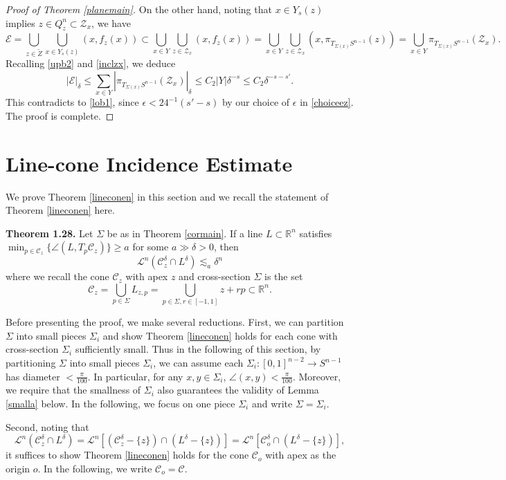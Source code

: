 \documentclass[11pt,a4paper,reqno]{amsart}
\newcommand{\R}{\mathbb{R}}
\newcommand{\calL}{\mathcal{L}}
\newcommand{\calC}{\mathcal{C}}
\newcommand{\calZ}{\mathcal{Z}}
\newcommand{\1}{\mathbf{1}}
\numberwithin{equation}{section}
\theoremstyle{plain}
\theoremstyle{definition}
\theoremstyle{remark}
\begin{document}
\begin{proof}[Proof of Theorem \ref{planemain}]
On the other hand,
noting that $x\in Y_s(z)$ implies $z\in Q_z^n \subset \calZ_x$, we have
$$ \mathcal{E} = \bigcup_{z \in \widetilde{Z}} \bigcup_{x \in Y_s(z)}(x,f_{z}(x)) \subset \bigcup_{x \in Y} \bigcup_{z \in \calZ_x} (x,f_{z}(x)) = \bigcup_{x \in Y} \bigcup_{z \in \calZ_x} (x,\pi_{T_{\Sigma(x)}S^{n-1}}(z)) = \bigcup_{x \in Y}\pi_{T_{\Sigma(x)}S^{n-1}}(\calZ_x).$$
Recalling \eqref{upb2} and \eqref{inclzx},
we deduce
\begin{equation}\label{lob2}
  |\mathcal{E}|_\delta \le \sum_{x \in Y} |\pi_{T_{\Sigma(x)}S^{n-1}}(\calZ_x)|_\delta \le C_2|Y|\delta^{-s}\le C_2\delta^{-s-s'} .
\end{equation}
This contradicts to \eqref{lob1}, since $\epsilon < 24^{-1}(s'-s)$ by our choice of $\epsilon$ in \eqref{choiceez}. The proof is complete.
\end{proof}




\section{Line-cone Incidence Estimate}\label{s4}

We prove Theorem \ref{lineconen} in this section and we recall the statement of Theorem \ref{lineconen} here.

\medskip
\noindent
{\bf Theorem 1.28.}
Let $\Sigma$ be as in Theorem \ref{cormain}.
If a line $L \subset \R^n$ satisfies $\min_{p \in \calC_z}\{\angle(L,T_p\calC_z)\}  \ge a$ for some $a \gg \delta >0$, then
  $$\calL^{n}(\calC_z^\delta \cap L^\delta) \lesssim_a \delta^n $$
  where we recall the cone $\calC_z$ with apex $z$ and cross-section $\Sigma$ is the set
$$\calC_z = \bigcup_{p \in \Sigma} L_{z,p} = \bigcup_{p \in \Sigma, r \in [-1,1]} z + rp \subset \R^n.$$


Before presenting the proof, we make several reductions. First, we can partition $\Sigma$ into small pieces $\Sigma_i$ and show Theorem \ref{lineconen} holds for each cone with cross-section $\Sigma_i$ sufficiently small. Thus in the following of this section,
by partitioning $\Sigma$ into small pieces $\Sigma_i$, we can assume each $\Sigma_i: [0,1]^{n-2} \to S^{n-1}$ has diameter $<\frac{\pi}{100}$. In particular, for any $x,y \in \Sigma_i$, $\angle(x,y) < \frac{\pi}{100}$. Moreover, we require that the smallness of $\Sigma_i$ also guarantees the validity of Lemma \ref{smalla} below.
In the following, we focus on one piece $\Sigma_i$ and write $\Sigma=\Sigma_i$.

Second, noting that
$$ \calL^{n}(\calC_z^\delta \cap L^\delta) = \calL^{n}[(\calC_z^\delta-\{z\}) \cap (L^\delta-\{z\})] = \calL^{n}[\calC_o^\delta \cap (L^\delta-\{z\})], $$
it suffices to show Theorem \ref{lineconen} holds for the cone $\calC_o$ with apex as the origin $o$. In the following, we write $\calC_o = \calC$.
\end{document}
